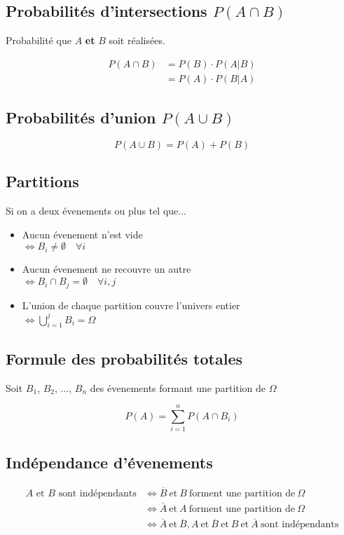 \documentclass{article}
\newcommand{\et}{\:\text{et}\:}
\begin{document}
\subsection{Probabilités d'intersections $P(A \cap B)$}
Probabilité que $A$ \textbf{et} $B$ soit réalisées.

\begin{equation*}
    \begin{split}
        P(A \cap B) &= P(B)\cdot P(A|B)\\
                    &= P(A)\cdot P(B|A)
    \end{split}
\end{equation*}

\subsection{Probabilités d'union $P(A \cup B)$}
\[P(A \cup B) = P(A) + P(B)\]


\subsection{Partitions}

Si on a deux évenements ou plus tel que...
\begin{itemize}
    \item Aucun évenement n'est vide \\$\iff B_i  \ne \emptyset \quad \forall i$
    \item Aucun évenement ne recouvre un autre \\$\iff B_i \cap B_j = \emptyset \quad \forall i, j$
    \item L'union de chaque partition couvre l'univers entier \\$\iff \bigcup_{i=1}^j B_i = \Omega$
\end{itemize}

\subsection{Formule des probabilités totales}

Soit $B_1$, $B_2$, ..., $B_n$ des évenements formant une partition de $\Omega$

\[P(A) = \sum_{i=1}^n P(A \cap B_i)\]

\subsection{Indépendance d'évenements}
\begin{equation*}
    \begin{split}
        A\text{ et }B\text{ sont indépendants} &\iff \overline{B} \et B  \:\text{forment une partition de}\: \Omega\\
                                               &\iff \overline{A} \et A  \:\text{forment une partition de}\: \Omega\\
                                               &\iff \overline{A} \et \overline{B}, A \et \overline{B} \et B \et \overline{A} \:\text{sont indépendants}
    \end{split}
\end{equation*}
\end{document}
